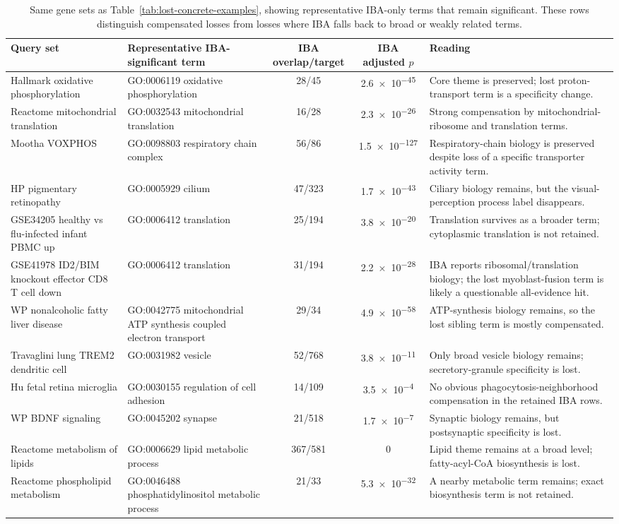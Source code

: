 \documentclass[11pt]{article}
\begin{document}
\begin{table}[t]
\centering
\caption{Same gene sets as Table~\ref{tab:lost-concrete-examples}, showing representative IBA-only terms that remain significant. These rows distinguish compensated losses from losses where IBA falls back to broad or weakly related terms.}
\label{tab:iba-compensation-examples}
\scriptsize
\setlength{\tabcolsep}{3.5pt}
\begin{tabularx}{\textwidth}{Y Y c c Y}
\toprule
Query set & Representative IBA-significant term & IBA overlap/target & IBA adjusted $p$ & Reading \\
\midrule
Hallmark oxidative phosphorylation & GO:0006119 oxidative phosphorylation & 28/45 & \num{2.6e-45} & Core theme is preserved; lost proton-transport term is a specificity change. \\
Reactome mitochondrial translation & GO:0032543 mitochondrial translation & 16/28 & \num{2.3e-26} & Strong compensation by mitochondrial-ribosome and translation terms. \\
Mootha VOXPHOS & GO:0098803 respiratory chain complex & 56/86 & \num{1.5e-127} & Respiratory-chain biology is preserved despite loss of a specific transporter activity term. \\
HP pigmentary retinopathy & GO:0005929 cilium & 47/323 & \num{1.7e-43} & Ciliary biology remains, but the visual-perception process label disappears. \\
GSE34205 healthy vs flu-infected infant PBMC up & GO:0006412 translation & 25/194 & \num{3.8e-20} & Translation survives as a broader term; cytoplasmic translation is not retained. \\
GSE41978 ID2/BIM knockout effector CD8 T cell down & GO:0006412 translation & 31/194 & \num{2.2e-28} & IBA reports ribosomal/translation biology; the lost myoblast-fusion term is likely a questionable all-evidence hit. \\
WP nonalcoholic fatty liver disease & GO:0042775 mitochondrial ATP synthesis coupled electron transport & 29/34 & \num{4.9e-58} & ATP-synthesis biology remains, so the lost sibling term is mostly compensated. \\
Travaglini lung TREM2 dendritic cell & GO:0031982 vesicle & 52/768 & \num{3.8e-11} & Only broad vesicle biology remains; secretory-granule specificity is lost. \\
Hu fetal retina microglia & GO:0030155 regulation of cell adhesion & 14/109 & \num{3.5e-4} & No obvious phagocytosis-neighborhood compensation in the retained IBA rows. \\
WP BDNF signaling & GO:0045202 synapse & 21/518 & \num{1.7e-7} & Synaptic biology remains, but postsynaptic specificity is lost. \\
Reactome metabolism of lipids & GO:0006629 lipid metabolic process & 367/581 & \num{0} & Lipid theme remains at a broad level; fatty-acyl-CoA biosynthesis is lost. \\
Reactome phospholipid metabolism & GO:0046488 phosphatidylinositol metabolic process & 21/33 & \num{5.3e-32} & A nearby metabolic term remains; exact biosynthesis term is not retained. \\
\bottomrule
\end{tabularx}
\end{table}
\end{document}
